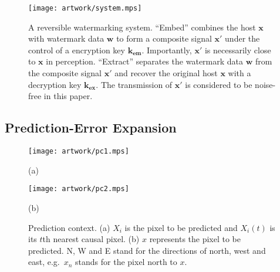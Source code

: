 \documentclass[journal]{IEEEtran}
\begin{document}
\begin{figure}[t]
    \centering
    \texttt{[image: artwork/system.mps]}
    \caption{\label{fig:wmsys}A reversible watermarking system. ``Embed'' combines the host
    $\mathbf{x}$ with watermark data $\mathbf{w}$ to form a composite signal $\mathbf{x'}$ under the
    control of a encryption key $\mathbf{k_{em}}$. Importantly, $\mathbf{x'}$ is necessarily close
    to $\mathbf{x}$ in perception. ``Extract'' separates the watermark data $\mathbf{w}$ from the
    composite signal $\mathbf{x'}$ and recover the original host $\mathbf{x}$ with a decryption key
    $\mathbf{k_{ex}}$. The transmission of $\mathbf{x'}$ is considered to be noise-free in this
    paper. }\medskip
\end{figure}

\subsection{Prediction-Error Expansion}\label{sub:pee}

\begin{figure}[t]
    \centering
  \begin{minipage}[htb]{.49\linewidth}
    \texttt{[image: artwork/pc1.mps]}
    \centerline{(a)}\medskip
  \end{minipage}
  \begin{minipage}[htb]{.49\linewidth}
    \texttt{[image: artwork/pc2.mps]}
    \centerline{(b)}\medskip
  \end{minipage}
    \caption{\label{fig:precontext}Prediction context. (a) $X_i$ is the pixel to be predicted and
    $X_i(t)$ is its $t$th nearest causal pixel. (b) $x$ represents the pixel to be predicted. N, W
    and E stand for the directions of north, west and east, e.g.\ $x_n$ stands for the pixel north
    to $x$.  }\medskip
\end{figure}
\end{document}
